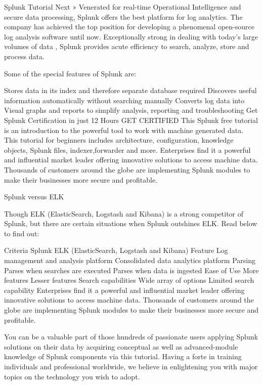 Splunk Tutorial
Next »
Venerated for real-time Operational Intelligence and secure data processing, Splunk offers the best platform for log analytics. The company has achieved the top position for developing a phenomenal open-source log analysis software until now. Exceptionally strong in dealing with today’s large volumes of data , Splunk provides acute efficiency to search, analyze, store and process data.

Some of the special features of Splunk are:

Stores data in its index and therefore separate database required
Discovers useful information automatically without searching manually
Converts log data into Visual graphs and reports to simplify analysis, reporting and troubleshooting
Get Splunk Certification in just 12 Hours
GET CERTIFIED
This Splunk free tutorial is an introduction to the powerful tool to work with machine generated data. This tutorial for beginners includes architecture, configuration, knowledge objects, Splunk files, indexer,forwarder and more. Enterprises find it a powerful and influential market leader offering innovative solutions to access machine data. Thousands of customers around the globe are implementing Splunk modules to make their businesses more secure and profitable.

Splunk versus ELK

Though ELK (ElasticSearch, Logstash and Kibana) is a strong competitor of Splunk, but there are certain situations when Splunk outshines ELK. Read below to find out:

Criteria	Splunk	ELK (ElasticSearch, Logstash and Kibana)
Feature	Log management and analysis platform	Consolidated data analytics platform
Parsing	Parses when searches are executed	Parses when data is ingested
Ease of Use	More features	Lesser features
Search capabilities	Wide array of options	Limited search capability
Enterprises find it a powerful and influential market leader offering innovative solutions to access machine data. Thousands of customers around the globe are implementing Splunk modules to make their businesses more secure and profitable.

You can be a valuable part of those hundreds of passionate users applying Splunk solutions on their data by acquiring conceptual as well as advanced-module knowledge of Splunk components via this tutorial. Having a forte in training individuals and professional worldwide, we believe in enlightening you with major topics on the technology you wish to adopt.

